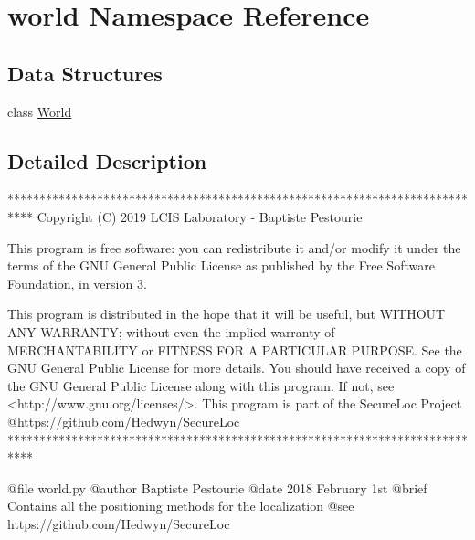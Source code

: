 \hypertarget{namespaceworld}{}\section{world Namespace Reference}
\label{namespaceworld}
\subsection*{Data Structures}
\begin{DoxyCompactItemize}
\item 
class \mbox{\hyperlink{classworld_1_1_world}{World}}
\end{DoxyCompactItemize}


\subsection{Detailed Description}
\begin{DoxyVerb}****************************************************************************
Copyright (C) 2019 LCIS Laboratory - Baptiste Pestourie

This program is free software: you can redistribute it and/or modify
it under the terms of the GNU General Public License as published by
the Free Software Foundation, in version 3.

This program is distributed in the hope that it will be useful,
but WITHOUT ANY WARRANTY; without even the implied warranty of
MERCHANTABILITY or FITNESS FOR A PARTICULAR PURPOSE. See the
GNU General Public License for more details.
You should have received a copy of the GNU General Public License
along with this program. If not, see <http://www.gnu.org/licenses/>.
This program is part of the SecureLoc Project @https://github.com/Hedwyn/SecureLoc
 ****************************************************************************

@file world.py
@author Baptiste Pestourie
@date 2018 February 1st
@brief Contains all the positioning methods for the localization
@see https://github.com/Hedwyn/SecureLoc
\end{DoxyVerb}
 